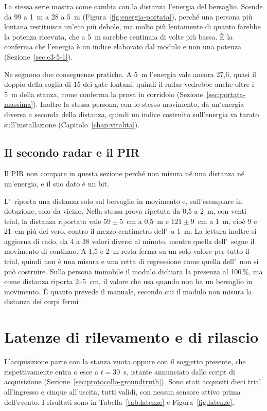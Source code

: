 La stessa serie mostra come cambia con la distanza l'energia del bersaglio. Scende da 99 a 1~m a 28 a 5~m (Figura~\ref{fig:energia-portata}), perché una persona più lontana restituisce un'eco più debole, ma molto più lentamente di quanto farebbe la potenza ricevuta, che a 5~m sarebbe centinaia di volte più bassa. È la conferma che l'energia è un indice elaborato dal modulo e non una potenza (Sezione~\ref{sec:c3-5-1}).

Ne seguono due conseguenze pratiche. A 5~m l'energia vale ancora 27,6, quasi il doppio della soglia di 15 dei gate lontani, quindi il radar vedrebbe anche oltre i 5~m della stanza, come conferma la prova in corridoio (Sezione~\ref{sec:portata-massima}). Inoltre la stessa persona, con lo stesso movimento, dà un'energia diversa a seconda della distanza, quindi un indice costruito sull'energia va tarato sull'installazione (Capitolo~\ref{chap:vitalita}).

\subsection{Il secondo radar e il PIR}
\label{sec:distanza-ld2420}

Il PIR non compare in questa sezione perché non misura né una distanza né un'energia, e il suo dato è un bit.

L'\ldc\ riporta una distanza solo sul bersaglio in movimento e, sull'esemplare in dotazione, solo da vicino. Nella stessa prova ripetuta da 0,5 a 2~m, con venti trial, la distanza riportata vale $59 \pm 5$~cm a 0,5~m e $121 \pm 9$~cm a 1~m, cioè 9 e 21~cm più del vero, contro il mezzo centimetro dell'\ldb\ a 1~m. La lettura inoltre si aggiorna di rado, da 4 a 38 valori diversi al minuto, mentre quella dell'\ldb\ segue il movimento di continuo. A 1,5 e 2~m resta ferma su un solo valore per tutto il trial, quindi non è una misura e una retta di regressione come quella dell'\ldb\ non si può costruire. Sulla persona immobile il modulo dichiara la presenza al 100\,\%, ma come distanza riporta 2--5~cm, il valore che usa quando non ha un bersaglio in movimento. È quanto prevede il manuale, secondo cui il modulo non misura la distanza dei corpi fermi~\cite[§8]{hilinkManualLD2420}.

\section{Latenze di rilevamento e di rilascio}
\label{sec:latenza}
\label{sec:rilascio}

L'acquisizione parte con la stanza vuota oppure con il soggetto presente, che
rispettivamente entra o esce a $t = 30$~s, istante annunciato dallo script di
acquisizione (Sezione~\ref{sec:protocollo-groundtruth}). Sono stati acquisiti dieci
trial all'ingresso e cinque all'uscita, tutti validi, con nessun sensore attivo prima
dell'evento. I risultati sono in Tabella~\ref{tab:latenze} e Figura~\ref{fig:latenze}.

